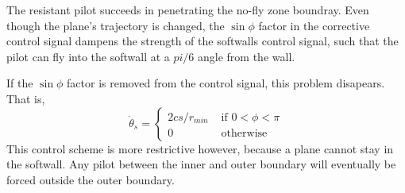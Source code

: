 \documentclass[11pt]{article}
\begin{document}
The resistant pilot succeeds in penetrating the no-fly zone boundray.  Even though the plane's trajectory is changed, the $\sin{\phi}$ factor in the corrective control signal dampens the strength of the softwalls control signal, such that the pilot can fly into the softwall at a  $pi/6$ angle from the wall.

If the $\sin{\phi}$ factor is removed from the control signal, this problem disapears.  That is,
\[
\dot{\theta}_s = \left \{
\begin{array}{ll}
2 c s/r_{min}& \mbox{ if } 0 < \phi < \pi\\
0 & \mbox{ otherwise}
\end{array}
\right .
\]
This control scheme is more restrictive however, because a plane cannot stay in the softwall.  Any pilot between the inner and outer boundary will eventually be forced outside the outer boundary.
\end{document}
